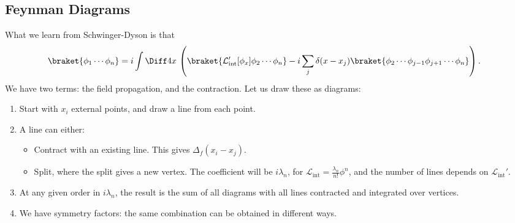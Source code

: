 \documentclass[12pt]{article}
\begin{document}
\subsection{Feynman Diagrams}%
\label{sub:fd}

What we learn from Schwinger-Dyson is that
\begin{align*}
	\braket{\phi_1 \cdots \phi_n} &= i \int \Diff 4 x \, \left( \braket{ \mathcal{L}_{\mathrm{int}}'[\phi_x] \phi_2 \cdots \phi_n} - i \sum_j \delta(x - x_j) \braket{\phi_2 \cdots \phi_{j-1} \phi_{j+1} \cdots \phi_n} \right).
\end{align*}
We have two terms: the field propagation, and the contraction. Let us draw these as diagrams:
\begin{enumerate}
	\item Start with $x_i$ external points, and draw a line from each point.
	\item A line can either:
		\begin{itemize}
			\item Contract with an existing line. This gives $\Delta_f(x_i - x_j)$.
			\item Split, where the split gives a new vertex. The coefficient will be $i \lambda_n$, for $\mathcal{L}_{\mathrm{int}} = \frac{\lambda_n}{n!} \phi^n$, and the number of lines depends on $\mathcal{L}_{\mathrm{int}}'$.
		\end{itemize}
	\item At any given order in $i \lambda_n$, the result is the sum of all diagrams with all lines contracted and integrated over vertices.
	\item We have symmetry factors: the same combination can be obtained in different ways.
\end{enumerate}





\newpage

\printindex
\end{document}
